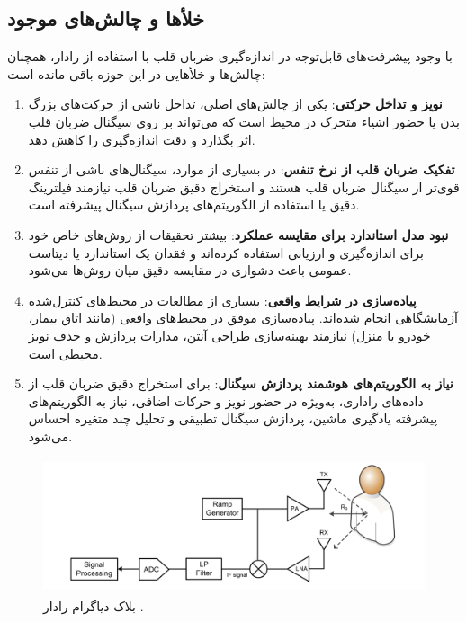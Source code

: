 \subsection{خلأها و چالش‌های موجود} %
\label{sec:gaps-challenges}

با وجود پیشرفت‌های قابل‌توجه در اندازه‌گیری ضربان قلب با استفاده از رادار، همچنان چالش‌ها و خلأهایی در این حوزه باقی مانده است:
\begin{enumerate}
    \item \textbf{نویز و تداخل حرکتی}: یکی از چالش‌های اصلی، تداخل ناشی از حرکت‌های بزرگ بدن یا حضور اشیاء متحرک در محیط است که می‌تواند بر روی سیگنال ضربان قلب اثر بگذارد و دقت اندازه‌گیری را کاهش دهد.
    \item \textbf{تفکیک ضربان قلب از نرخ تنفس}: در بسیاری از موارد، سیگنال‌های ناشی از تنفس قوی‌تر از سیگنال ضربان قلب هستند و استخراج دقیق ضربان قلب نیازمند فیلترینگ دقیق یا استفاده از الگوریتم‌های پردازش سیگنال پیشرفته است.\cite{adib2015smart}
    \item \textbf{نبود مدل استاندارد برای مقایسه عملکرد}: بیشتر تحقیقات از روش‌های خاص خود برای اندازه‌گیری و ارزیابی استفاده کرده‌اند و فقدان یک استاندارد یا دیتاست عمومی باعث دشواری در مقایسه دقیق میان روش‌ها می‌شود.
    \item \textbf{پیاده‌سازی در شرایط واقعی}: بسیاری از مطالعات در محیط‌های کنترل‌شده آزمایشگاهی انجام شده‌اند. پیاده‌سازی موفق در محیط‌های واقعی (مانند اتاق بیمار، خودرو یا منزل) نیازمند بهینه‌سازی طراحی آنتن، مدارات پردازش و حذف نویز محیطی است.
    \item \textbf{نیاز به الگوریتم‌های هوشمند پردازش سیگنال}: برای استخراج دقیق ضربان قلب از داده‌های راداری، به‌ویژه در حضور نویز و حرکات اضافی، نیاز به الگوریتم‌های پیشرفته یادگیری ماشین، پردازش سیگنال تطبیقی و تحلیل چند متغیره احساس می‌شود.
\end{enumerate}



\vspace{2cm}
\begin{center}
\begin{figure}[!h]
\includegraphics[height=4cm,width=12cm]{Images/chapter1/1-2.png}
\caption{بلاک دیاگرام رادار .\cite{adib2015smart}
}
\end{figure}
\end{center}
\vspace{2cm}

